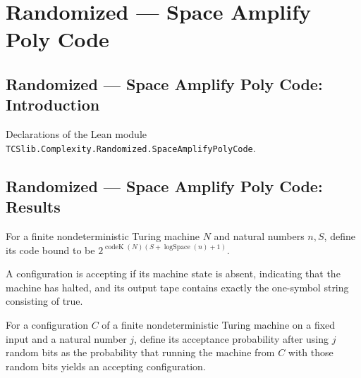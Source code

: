 \section{Randomized --- Space Amplify Poly Code}
\subsection*{Randomized --- Space Amplify Poly Code: Introduction}

Declarations of the Lean module \texttt{TCSlib.Complexity.Randomized.SpaceAmplifyPolyCode}.

\subsection*{Randomized --- Space Amplify Poly Code: Results}

\begin{definition}
\label{Randomized.PolyAmp.codeBound}
\leanok
{}
For a finite nondeterministic Turing machine $N$ and natural numbers $n,S$, define its
code bound to be $2^{\operatorname{codeK}(N)(S+\operatorname{logSpace}(n)+1)}$.
\end{definition}

\begin{definition}
\label{Randomized.PolyAmp.Accepting}
\leanok
{}
A configuration is accepting if its machine state is absent, indicating that the machine
has halted, and its output tape contains exactly the one-symbol string consisting of
true.
\end{definition}

\begin{definition}
\label{Randomized.PolyAmp.accP}
\leanok
{}
For a configuration $C$ of a finite nondeterministic Turing machine on a fixed input and
a natural number $j$, define its acceptance probability after using $j$ random bits as
the probability that running the machine from $C$ with those random bits yields an
accepting configuration.
\end{definition}

